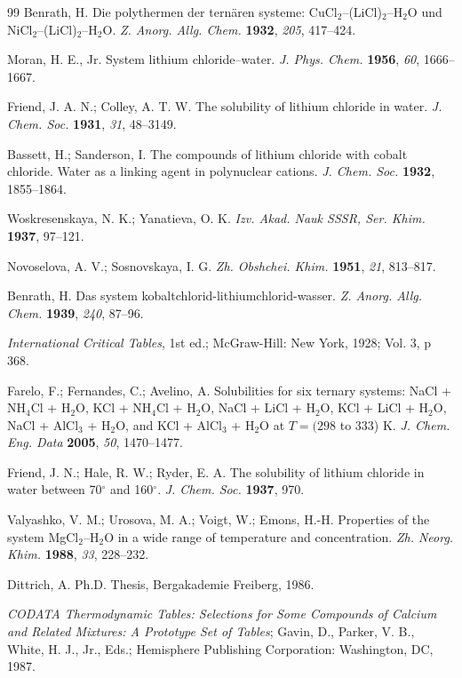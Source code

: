 \documentclass[11pt]{article}
\begin{document}
\begin{thebibliography}{99}
 Benrath, H. Die polythermen der tern\"aren systeme:
CuCl$_2$--(LiCl)$_2$--H$_2$O und NiCl$_2$--(LiCl)$_2$--H$_2$O. \textit{Z.
Anorg. Allg. Chem.} \textbf{1932}, \textit{205}, 417--424.

 Moran, H. E., Jr. System lithium chloride--water. \textit{J.
Phys. Chem.} \textbf{1956}, \textit{60}, 1666--1667.

 Friend, J. A. N.; Colley, A. T. W. The solubility of lithium
chloride in water. \textit{J. Chem. Soc.} \textbf{1931}, \textit{31},
48--3149.

 Bassett, H.; Sanderson, I. The compounds of lithium chloride
with cobalt chloride. Water as a linking agent in polynuclear cations.
\textit{J. Chem. Soc.} \textbf{1932}, 1855--1864.

 Woskresenskaya, N. K.; Yanatieva, O. K. \textit{Izv. Akad.
Nauk SSSR, Ser. Khim.} \textbf{1937}, 97--121.

 Novoselova, A. V.; Sosnovskaya, I. G. \textit{Zh. Obshchei.
Khim.} \textbf{1951}, \textit{21}, 813--817.

 Benrath, H. Das system
kobaltchlorid-lithiumchlorid-wasser. \textit{Z. Anorg. Allg. Chem.}
\textbf{1939}, \textit{240}, 87--96.

 \textit{International Critical Tables}, 1st ed.; McGraw-Hill:
New York, 1928; Vol. 3, p 368.

 Farelo, F.; Fernandes, C.; Avelino, A. Solubilities for six
ternary systems: NaCl + NH$_4$Cl + H$_2$O, KCl + NH$_4$Cl + H$_2$O,
NaCl + LiCl + H$_2$O, KCl + LiCl + H$_2$O, NaCl + AlCl$_3$ + H$_2$O, and
KCl + AlCl$_3$ + H$_2$O at $T = (298$ to 333) K. \textit{J. Chem. Eng. Data}
\textbf{2005}, \textit{50}, 1470--1477.

 Friend, J. N.; Hale, R. W.; Ryder, E. A. The solubility of
lithium chloride in water between 70$^{\circ}$ and 160$^{\circ}$. \textit{J.
Chem. Soc.} \textbf{1937}, 970.

 Valyashko, V. M.; Urosova, M. A.; Voigt, W.; Emons, H.-H.
Properties of the system MgCl$_2$--H$_2$O in a wide range of temperature and
concentration. \textit{Zh. Neorg. Khim.} \textbf{1988}, \textit{33},
228--232.

 Dittrich, A. Ph.D. Thesis, Bergakademie Freiberg, 1986.

 \textit{CODATA Thermodynamic Tables: Selections for Some
Compounds of Calcium and Related Mixtures: A Prototype Set of Tables}; Gavin,
D., Parker, V. B., White, H. J., Jr., Eds.; Hemisphere Publishing Corporation:
Washington, DC, 1987.

\end{thebibliography}
\end{document}
